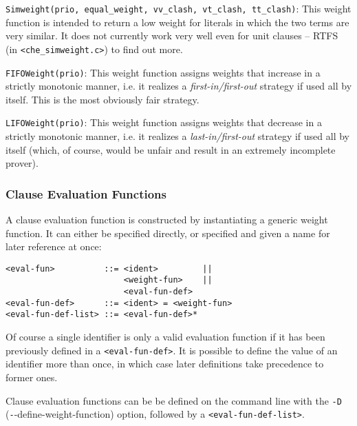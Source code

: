 \documentclass{article}
\begin{document}
\medskip
\begin{sloppypar}
\noindent{}\texttt{Simweight(prio, equal\_weight,
  vv\_clash, vt\_clash, tt\_clash)}: This weight function is intended
to return a low weight for literals in which the two terms are very
similar. It does not currently work very well even for unit clauses --
RTFS (in \texttt{<che\_simweight.c>}) to find out more.
\end{sloppypar}

\medskip
\begin{sloppypar}
\noindent{}\texttt{FIFOWeight(prio)}:
This weight function assigns weights that increase in a strictly
monotonic manner, i.e. it realizes a \emph{first-in/first-out}
strategy if used all by itself. This is the most obviously fair
strategy.
\end{sloppypar}

\medskip
\begin{sloppypar}
\noindent{}\texttt{LIFOWeight(prio)}:
This weight function assigns weights that decrease in a strictly
monotonic manner, i.e. it realizes a \emph{last-in/first-out}
strategy if used all by itself (which, of course, would be unfair and
result in an extremely incomplete prover).
\end{sloppypar}


\subsubsection{Clause Evaluation Functions}

A clause evaluation function is constructed by instantiating a generic
weight function. It can either be specified directly, or specified and
given a name for later reference at once:

 \begin{verbatim}
<eval-fun>          ::= <ident>         ||
                        <weight-fun>    ||
                        <eval-fun-def>  
<eval-fun-def>      ::= <ident> = <weight-fun>
<eval-fun-def-list> ::= <eval-fun-def>*
\end{verbatim}

Of course a single identifier is only a valid evaluation function if
it has been previously defined in a \texttt{<eval-fun-def>}. It is
possible to define the value of an identifier more than once, in which
case later definitions take precedence to former ones.

Clause evaluation functions can be be defined on the command line with
the \texttt{-D} (\texttt--{define-weight-function}) option, followed
by a \texttt{<eval-fun-def-list>}.
\end{document}

